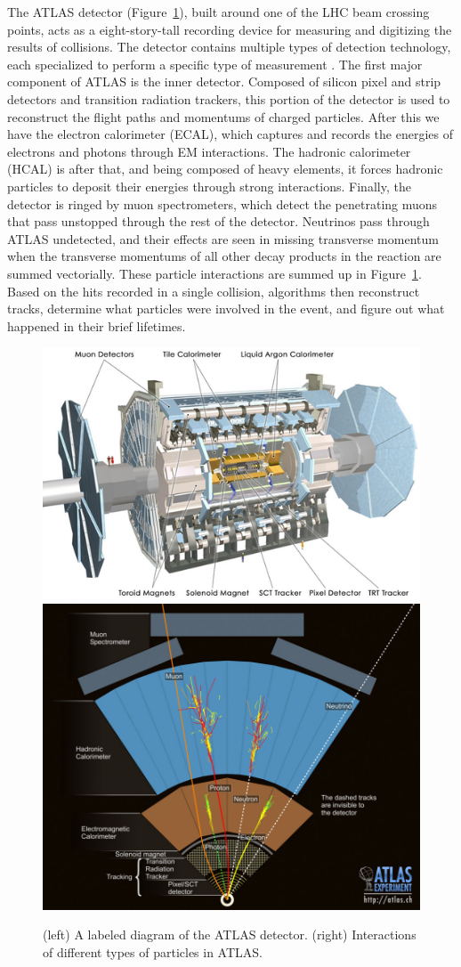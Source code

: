 \documentclass{article}
\begin{document}
The ATLAS detector (Figure~\ref{ATLAS}), built around one of the LHC beam crossing points, acts as a eight-story-tall recording device for measuring and digitizing the results of collisions. The detector contains multiple types of detection technology, each specialized to perform a specific type of measurement \cite{ATLAS_website}. The first major component of ATLAS is the inner detector. Composed of silicon pixel and strip detectors and transition radiation trackers, this portion of the detector is used to reconstruct the flight paths and momentums of charged particles. After this we have the electron calorimeter (ECAL), which captures and records the energies of electrons and photons through EM interactions. The hadronic calorimeter (HCAL) is after that, and being composed of heavy elements, it forces hadronic particles to deposit their energies through strong interactions. Finally, the detector is ringed by muon spectrometers, which detect the penetrating muons that pass unstopped through the rest of the detector. Neutrinos pass through ATLAS undetected, and their effects are seen in missing transverse momentum when the transverse momentums of all other decay products in the reaction are summed vectorially. These particle interactions are summed up in Figure~\ref{ATLAS}. Based on the hits recorded in a single collision, algorithms then reconstruct tracks, determine what particles were involved in the event, and figure out what happened in their brief lifetimes.

\begin{figure}[t]
    \centering
    \includegraphics[width=0.49\linewidth]{images/ATLAS.png}
    \includegraphics[width=0.41\linewidth]{images/ATLASinteractions.jpg}
    \caption{(left) A labeled diagram of the ATLAS detector. (right) Interactions of different types of particles in ATLAS.}
    \label{ATLAS}
\end{figure}
\end{document}
